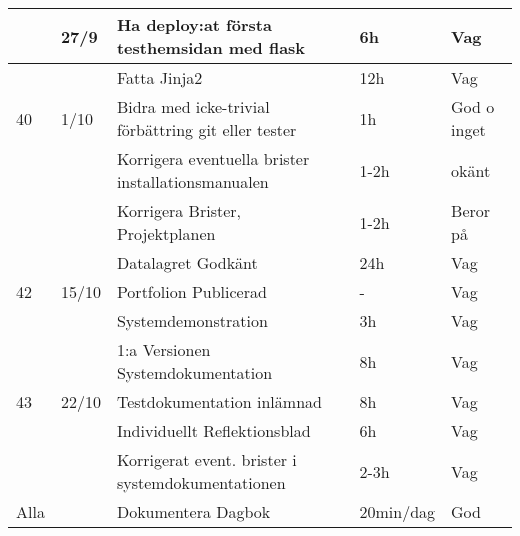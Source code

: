 \documentclass{TDP003mall}
\begin{document}
\begin{tabularx}{\linewidth}{|l|l|X|l|l|}
          & 27/9  & Ha deploy:at första testhemsidan med flask          & 6h             & Vag         \\
	\hline                                                              
          &       & Fatta Jinja2                                        & 12h            & Vag         \\
	\hline                                                              
	40    & 1/10  & Bidra med icke-trivial förbättring git eller tester & 1h             & God o inget \\
	\hline                                                              
          &       & Korrigera eventuella brister installationsmanualen  & 1-2h           & okänt       \\
	\hline                                                              
          &       & Korrigera Brister, Projektplanen                    & 1-2h           & Beror på    \\
	\hline                                                              
          &       & Datalagret Godkänt                                  & 24h            & Vag         \\
	\hline                                                              
	42    & 15/10 & Portfolion Publicerad                               & -              & Vag         \\
	\hline                                                              
          &       & Systemdemonstration                                 & 3h             & Vag         \\
	\hline                                                              
          &       & 1:a Versionen Systemdokumentation                   & 8h             & Vag         \\
	\hline                                                              
	43    & 22/10 & Testdokumentation inlämnad                          & 8h             & Vag         \\
	\hline                                                              
          &       & Individuellt Reflektionsblad                        & 6h             & Vag         \\
	\hline                                                              
          &       & Korrigerat event. brister i systemdokumentationen   & 2-3h           & Vag         \\
	\hline                                                              
	\hline                                                              
	Alla  &       & Dokumentera Dagbok                                  & 20min/dag      & God         \\
	\hline
\end{tabularx}
\end{document}
